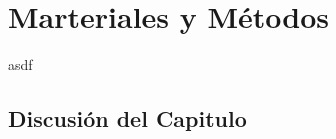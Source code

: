 \chapter{Marteriales y Métodos}
\label{chap:MaterialesYMetodos}

asdf

%

\section{Discusión del Capitulo}





